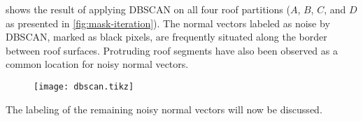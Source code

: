  shows the result of applying DBSCAN on all four roof partitions ($A$, $B$, $C$, and $D$ as presented in \cref{fig:mask-iteration}).
The normal vectors labeled as noise by DBSCAN, marked as black pixels, are frequently situated along the border between roof surfaces.
Protruding roof segments have also been observed as a common location for noisy normal vectors.
\begin{figure}[H]
  \centering
  \texttt{[image: dbscan.tikz]}
  \label{fig:dbscan-tile}
\end{figure}
\noindent
The labeling of the remaining noisy normal vectors will now be discussed.

